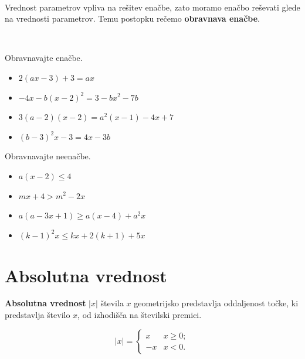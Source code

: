 ~
            
                Vrednost parametrov vpliva na rešitev enačbe, zato moramo enačbo reševati glede na vrednosti parametrov.
                Temu postopku rečemo \textbf{obravnava enačbe}.
            
        

~~~

        
            \begin{naloga}
                Obravnavajte enačbe.
                \begin{itemize}
                        \item $2(ax-3)+3=ax$ 
                        \item $-4x-b(x-2)^2=3-bx^2-7b$ 
                        \item $3(a-2)(x-2)=a^2(x-1)-4x+7$ 
                        \item $(b-3)^2x-3=4x-3b$ 
                \end{itemize}
            \end{naloga}
        

        
            \begin{naloga}
                Obravnavajte neenačbe.
                \begin{itemize}
                        \item $a(x-2)\leq 4$ 
                        \item $mx+4>m^2-2x$ 
                        \item $a(a-3x+1)\geq a(x-4)+a^2x$ 
                        \item $(k-1)^2x\leq kx+2(k+1)+5x$ 
                \end{itemize}
            \end{naloga}
        



\newpage


\section{Absolutna vrednost}

        
            \textbf{Absolutna vrednost} $|x|$ števila $x$ geometrijsko predstavlja oddaljenost točke, 
            ki predstavlja število $x$, od izhodišča na številski premici.
        

       
            $$|x|=\begin{cases} x &x\geq 0; \\ -x & x<0. \end{cases}$$
        

